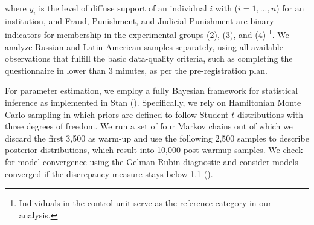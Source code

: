 \documentclass[11pt, ngerman,english,a4]{article}
\begin{document}
\noindent where $y_i$ is the level of diffuse support of an individual $i$ with ($i=1,...,n$) for an institution, and Fraud, Punishment, and Judicial Punishment are binary indicators for membership in the experimental groups (2),  (3), and (4) \footnote{Individuals in the control unit serve as the reference category in our analysis.}. We analyze Russian and Latin American samples separately, using all available observations that fulfill the basic data-quality criteria, such as completing the questionnaire in lower than 3 minutes, as per the pre-registration plan. 

For parameter estimation, we employ a fully Bayesian framework for statistical inference as implemented in Stan (\citealt{StanDevelopmentTeam2020}). 
Specifically, we rely on Hamiltonian Monte Carlo sampling in which priors are defined to follow Student-$t$ distributions with three degrees of freedom.
We run a set of four Markov chains out of which we discard the first 3,500 as warm-up and use the following 2,500 samples to describe posterior distributions, which result into 10,000 post-warmup samples. We check for model convergence using the Gelman-Rubin diagnostic and consider models converged if the discrepancy measure stays below 1.1 (\citealt{Gelman2004}).



\end{document}
